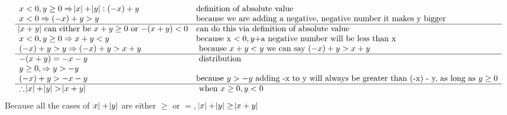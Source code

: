 \documentclass[letterpaper]{article}
\begin{document}
       \subsubsection{}
        	\begin{displaymath}
        		\begin{array}{ll}
                	x < 0, y \geq 0 \Rightarrow \abs{x} + \abs{y}: (-x) + y & $definition of absolute value$\\
                	x < 0 \Rightarrow (-x) + y > y & $because we are adding a negative, negative number it makes y bigger$\\
                    \hline
                	\abs{x + y} $ can either be $ x + y \geq 0 $ or $ -(x + y) < 0 & $can do this via definition of absolute value$\\
                    x < 0, y \geq 0 \Rightarrow x + y < y & $because x $< 0, y + $a negative number will be less than x$\\
                    (-x) + y > y\Rightarrow (-x) + y > x + y & $ because $x + y < y $ we can say $ (-x) + y > x + y \\
                    \hline
                    -(x + y) = -x - y & $ distribution$\\
                    y \geq 0, \Rightarrow y > -y &\\
                    (-x) + y > -x - y &  $because $ y > -y $ adding -x to y will always be greater than (-x) - y, as long as $ y \geq 0\\
                    \hline
                    \therefore \abs{x} + \abs{y} > \abs{x + y} & $ when $ x \geq 0, y < 0\\
                \end{array} 
        	\end{displaymath}
    Because all the cases of $\abs{x} + \abs{y}$ are either $\geq$ or $=$, $\abs{x} + \abs{y} \geq \abs{x + y}$\\
\end{document}
